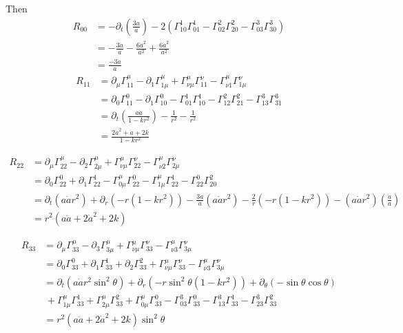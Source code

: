 \documentclass{article}
\begin{document}
Then
\begin{align*}
R_{00} &= -\partial_t\left(\frac{\dot{3a}}{a}\right)-2(\Gamma^{1}_{10}\Gamma^1_{01}-\Gamma^2_{02}\Gamma^2_{20}-\Gamma^3_{03}\Gamma^3_{30})\\
&=-\frac{3\ddot{a}}{a}-\frac{6\dot{a}^2}{a^2}+\frac{6\dot{a}^2}{a^2}\\
&= \frac{-3\ddot{a}}{a}
\end{align*}
\begin{align*}
R_{11} &= \partial_\mu\Gamma^\mu_{11}-\partial_1\Gamma^\mu_{1\mu}+\Gamma^\mu_{\nu\mu}\Gamma^\nu_{11}-\Gamma^{\mu}_{\nu1}\Gamma^{\nu}_{1\mu}\\
&= \partial_0\Gamma^0_{11}-\partial_1\Gamma^0_{10}-\Gamma^1_{01}\Gamma^1_{10}-\Gamma^2_{12}\Gamma^2_{21}-\Gamma^3_{13}\Gamma^3_{31}\\
&=\partial_t(\frac{a\dot{a}}{1-kr^2})-\frac{1}{r^2}-\frac{1}{r^2}\\
&= \frac{2\dot{a}^2+\ddot{a}+2k}{1-kr^2}
\end{align*}

\begin{align*}
R_{22} &= \partial_\mu\Gamma^\mu_{22}-\partial_2\Gamma^\mu_{2\mu}+\Gamma^\mu_{\nu\mu}\Gamma^\nu_{22}-\Gamma^{\mu}_{\nu2}\Gamma^{\nu}_{2\mu}\\
&=\partial_0\Gamma^0_{22}+\partial_1\Gamma^1_{22}-\Gamma^\mu_{0\mu}\Gamma^0_{22}-\Gamma^\mu_{1\mu}\Gamma^1_{22}-\Gamma^0_{22}\Gamma^2_{20}\\
&= \partial_t(a\dot{a}r^2)+\partial_r(-r(1-kr^2))-\frac{3\dot{a}}{a}(a\dot{a}r^2)-\frac{2}{r}(-r(1-kr^2))-(a\dot{a}r^2)(\frac{\dot{a}}{a})\\
&=r^2(a\ddot{a}+2\dot{a}^2+2k)
\end{align*}

\begin{align*}
R_{33} &= \partial_\mu\Gamma^\mu_{33}-\partial_3\Gamma^\mu_{3\mu}+\Gamma^\mu_{\nu\mu}\Gamma^\nu_{33}-\Gamma^{\mu}_{\nu3}\Gamma^{\nu}_{3\mu}\\
&=\partial_0\Gamma^0_{33}+\partial_1\Gamma^1_{33}+\partial_2\Gamma^2_{33}+\Gamma^\mu_{\nu\mu}\Gamma^\nu_{33}-\Gamma^\mu_{\nu3}\Gamma^\nu_{3\mu}\\
&= \partial_t(a\dot{a}r^2\sin^2\theta)+\partial_r(-r\sin^2\theta(1-kr^2))+\partial_\theta(-\sin\theta\cos\theta)\\
&\,+\Gamma^\mu_{1\mu}\Gamma^1_{33}+\Gamma^\mu_{2\mu}\Gamma^2_{33}+\Gamma^\mu_{0\mu}\Gamma^0_{33}-\Gamma^3_{03}\Gamma^0_{33}-\Gamma^3_{13}\Gamma^1_{33}-\Gamma^3_{23}\Gamma^2_{33}\\
&=r^2(a\ddot{a}+2\dot{a}^2+2k)\sin^2\theta
\end{align*}
\end{document}
